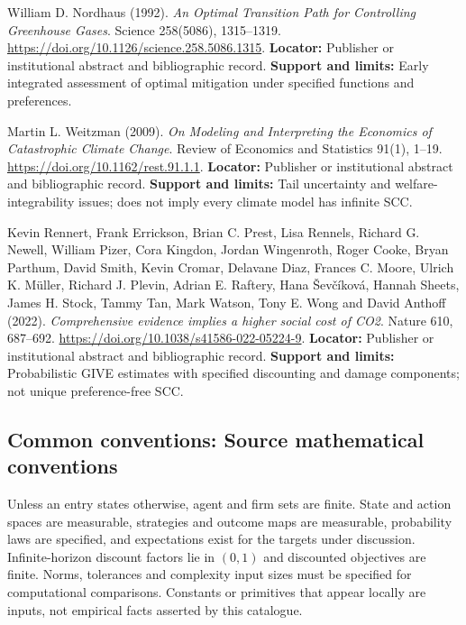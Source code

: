 \documentclass[11pt,a4paper]{article}
\begin{document}
\begin{enumerate}[label={[\textnormal{S}\arabic*]},leftmargin=*]

\item William D. Nordhaus (1992). \emph{An Optimal Transition Path for Controlling Greenhouse Gases}. Science 258(5086), 1315–1319. \url{https://doi.org/10.1126/science.258.5086.1315}. \textbf{Locator:} Publisher or institutional abstract and bibliographic record. \textbf{Support and limits:} Early integrated assessment of optimal mitigation under specified functions and preferences.

\item Martin L. Weitzman (2009). \emph{On Modeling and Interpreting the Economics of Catastrophic Climate Change}. Review of Economics and Statistics 91(1), 1–19. \url{https://doi.org/10.1162/rest.91.1.1}. \textbf{Locator:} Publisher or institutional abstract and bibliographic record. \textbf{Support and limits:} Tail uncertainty and welfare-integrability issues; does not imply every climate model has infinite SCC.

\item Kevin Rennert, Frank Errickson, Brian C. Prest, Lisa Rennels, Richard G. Newell, William Pizer, Cora Kingdon, Jordan Wingenroth, Roger Cooke, Bryan Parthum, David Smith, Kevin Cromar, Delavane Diaz, Frances C. Moore, Ulrich K. Müller, Richard J. Plevin, Adrian E. Raftery, Hana Ševčíková, Hannah Sheets, James H. Stock, Tammy Tan, Mark Watson, Tony E. Wong and David Anthoff (2022). \emph{Comprehensive evidence implies a higher social cost of CO2}. Nature 610, 687–692. \url{https://doi.org/10.1038/s41586-022-05224-9}. \textbf{Locator:} Publisher or institutional abstract and bibliographic record. \textbf{Support and limits:} Probabilistic GIVE estimates with specified discounting and damage components; not unique preference-free SCC.

\end{enumerate}

\subsection*{Common conventions: Source mathematical conventions}

Unless an entry states otherwise, agent and firm sets are finite. State and action spaces are measurable, strategies and outcome maps are measurable, probability laws are specified, and expectations exist for the targets under discussion. Infinite-horizon discount factors lie in $(0,1)$ and discounted objectives are finite. Norms, tolerances and complexity input sizes must be specified for computational comparisons. Constants or primitives that appear locally are inputs, not empirical facts asserted by this catalogue.
\end{document}
